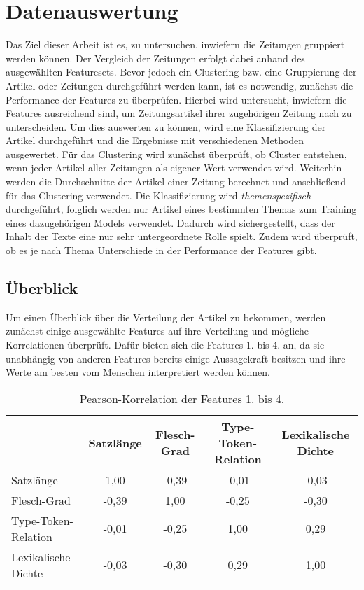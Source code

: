 \chapter{Datenauswertung}
Das Ziel dieser Arbeit ist es, zu untersuchen, inwiefern die Zeitungen gruppiert werden können. Der Vergleich der Zeitungen erfolgt dabei anhand des ausgewählten Featuresets. Bevor jedoch ein Clustering bzw. eine Gruppierung der Artikel oder Zeitungen durchgeführt werden kann, ist es notwendig, zunächst die Performance der Features zu überprüfen. Hierbei wird untersucht, inwiefern die Features ausreichend sind, um Zeitungsartikel ihrer zugehörigen Zeitung nach zu unterscheiden. Um dies auswerten zu können, wird eine Klassifizierung der Artikel durchgeführt und die Ergebnisse mit verschiedenen Methoden ausgewertet. Für das Clustering wird zunächst überprüft, ob Cluster entstehen, wenn jeder Artikel aller Zeitungen als eigener Wert verwendet wird. Weiterhin werden die Durchschnitte der Artikel einer Zeitung berechnet und anschließend für das Clustering verwendet. Die Klassifizierung wird \emph{themenspezifisch} durchgeführt, folglich werden nur Artikel eines bestimmten Themas zum Training eines dazugehörigen Models verwendet. Dadurch wird sichergestellt, dass der Inhalt der Texte eine nur sehr untergeordnete Rolle spielt. Zudem wird überprüft, ob es je nach Thema Unterschiede in der Performance der Features gibt.

\section{Überblick}
Um einen Überblick über die Verteilung der Artikel zu bekommen, werden zunächst einige ausgewählte Features auf ihre Verteilung und mögliche Korrelationen überprüft. Dafür bieten sich die Features 1. bis 4. an, da sie unabhängig von anderen Features bereits einige Aussagekraft besitzen und ihre Werte am besten vom Menschen interpretiert werden können.

\begin{table}[t]
\centering
\begin{spacing}{1.25}
\begin{tabular}[t]{lcccc}
\toprule
~ & Satzlänge & Flesch-Grad & Type-Token-Relation & Lexikalische Dichte\\
\midrule
Satzlänge & 1,00 & -0,39 & -0,01 & -0,03\\
Flesch-Grad & -0,39 & 1,00 & -0,25 & -0,30\\
Type-Token-Relation & -0,01 & -0,25 & 1,00 & 0,29\\
Lexikalische Dichte & -0,03 & -0,30 & 0,29 & 1,00\\
\bottomrule
\end{tabular}
\caption{Pearson-Korrelation der Features 1. bis 4.}
\label{table.correlation}
\end{spacing}
\end{table}

